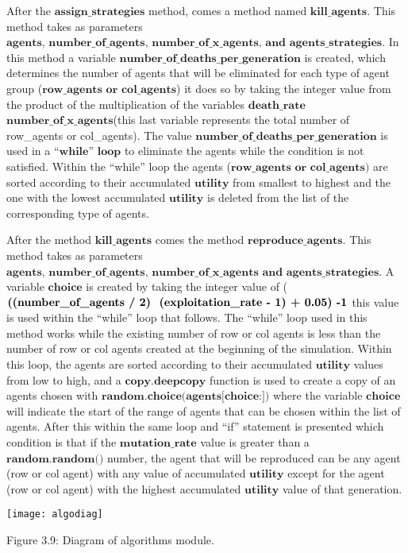 \documentclass{article}
\begin{document}
After the $\textbf{assign\_strategies}$ method, comes a method named $\textbf{kill\_agents}$. This method takes as parameters $\textbf{agents, number\_of\_agents, number\_of\_x\_agents, and agents\_strategies}$. In this method a variable $\textbf{number\_of\_deaths\_per\_generation}$ is created, which determines the number of agents that will be eliminated for each type of agent group ($\textbf{row\_agents or col\_agents}$) it does so by taking the integer value from the product of the multiplication of the variables $\textbf{death\_rate}$ \* $\textbf{number\_of\_x\_agents}$(this last variable represents the total number of row\_agents or col\_agents).  The value $\textbf{number\_of\_deaths\_per\_generation}$ is used in a $\textbf{``while'' loop}$ to eliminate the agents while the condition is not satisfied. Within the ``while'' loop the agents ($\textbf{row\_agents or col\_agents)}$  are sorted according to their accumulated $\textbf{utility}$ from smallest to highest and the one with the lowest accumulated $\textbf{utility}$ is deleted from the list of the corresponding type of agents.

After the method $\textbf{kill\_agents}$ comes the method $\textbf{reproduce\_agents}$. This method takes as parameters $\textbf{agents, number\_of\_agents, number\_of\_x\_agents and agents\_strategies}$. A variable $\textbf{choice}$ is created by taking the integer value of ($\textbf{((number\_of\_agents / 2) \*  (exploitation\_rate - 1) + 0.05) -1}$ this value is used within the ``while'' loop that follows. The ``while'' loop used in this method works while the existing number of row or col agents is less than the number of row or col agents created at the beginning of the simulation. Within this loop, the agents are sorted according to their accumulated $\textbf{utility}$ values from low to high, and a $\textbf{copy.deepcopy}$  function is used to create a copy of an agents chosen with $\textbf{random.choice(agents[choice:])}$ where the variable $\textbf{choice}$ will indicate the start of the range of agents that can be chosen within the list of agents. After this within the same loop and ``if'' statement is presented which condition is that if the $\textbf{mutation\_rate}$ value is greater than a $\textbf{random.random()}$ number, the agent that will be reproduced can be any agent (row or col agent) with any value of accumulated $\textbf{utility}$ except for the agent (row or col agent) with the highest accumulated $\textbf{utility}$  value of that generation.

\begin{center}
	\texttt{[image: algodiag]}

Figure 3.9: Diagram of algorithms module.
\end{center}
\end{document}
